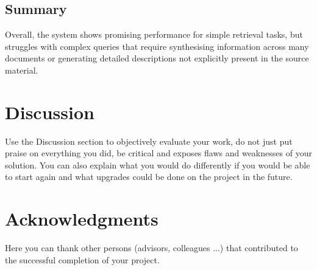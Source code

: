 \documentclass[fleqn,moreauthors,10pt]{ds_report}
\begin{document}
\subsection*{Summary}

Overall, the system shows promising performance for simple retrieval tasks, but struggles with complex queries that require synthesising information across many documents or generating detailed descriptions not explicitly present in the source material.

\section*{Discussion}

Use the Discussion section to objectively evaluate your work, do not just put praise on everything you did, be critical and exposes flaws and weaknesses of your solution. You can also explain what you would do differently if you would be able to start again and what upgrades could be done on the project in the future.



\section*{Acknowledgments}

Here you can thank other persons (advisors, colleagues ...) that contributed to the successful completion of your project.




\end{document}
